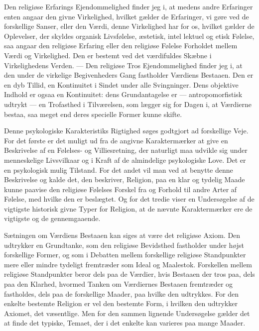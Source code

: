 \documentclass[12pt,a4paper]{article}
\newcommand{\opage}[1]{\marginnote{\footnotesize\textit{[#1]}}}
\begin{document}
Den religiøse Erfarings Ejendommelighed finder jeg i, at medens andre
Erfaringer enten angaar den givne Virkelighed, hvilket gælder de Erfaringer,
vi gøre ved de forskellige Sanser, eller den Værdi, denne Virkelighed har for
os, hvilket gælder de Oplevelser, der skyldes organisk Livsfølelse, æstetisk,
intel\-%
\opage{417}lektuel og etisk Følelse, saa angaar den religiøse Erfaring eller den religiøse
Følelse Forholdet mellem Værdi og Virkelighed. Den er bestemt ved det
værdifuldes Skæbne i Virkelighedens Verden. --- Den religiøse Tros
Ejendommelighed finder jeg i, at den under de virkelige Begivenheders Gang
fastholder Værdiens Bestaaen. Den er en dyb Tillid, en Kontinuitet i Sindet
under alle Svingninger. Dens objektive Indhold er ogsaa en Kontinuitet: dens
Grundantagelse er --- antropomorfistisk udtrykt --- en Trofasthed i
Tilværelsen, som lægger sig for Dagen i, at Værdierne bestaa, saa meget end
deres specielle Former kunne skifte.

Denne psykologiske Karakteristiks Rigtighed søges godtgjort ad forskellige
Veje. For det første er det muligt ud fra de angivne Karaktermærker at give en
Beskrivelse af en Følelses- og Villiesretning, der naturligt maa udvikle sig
under menneskelige Livsvilkaar og i Kraft af de almindelige psykologiske Love.
Det er en psykologisk mulig Tilstand. For det andet vil man ved at benytte
denne Beskrivelse og kalde det, den beskriver, Religion, paa en klar og tydelig
Maade kunne paavise den religiøse Følelses Forskel fra og Forhold til andre
Arter af Følelse, med hvilke den er beslægtet. Og for det tredie viser en
Undersøgelse af de vigtigste historisk givne Typer for Religion, at de nævnte
Karaktermærker ere de vigtigste og de gennemgaaende.

Sætningen om Værdiens Bestaaen kan siges at være det religiøse Axiom. Den
udtrykker en Grundtanke, som den religiøse Bevidsthed fastholder under højst
forskellige Former, og som i Debatten mellem forskellige religiøse Standpunkter
mere eller mindre tydeligt fremtræder som Ideal og Maalestok. Forskellen mellem
religiøse Standpunkter beror dels paa de Værdier, hvis Bestaaen der tros paa,
dels paa den Klarhed, hvormed Tanken om Værdiernes Bestaaen fremtræder og
fastholdes, dels paa de forskellige Maader, paa hvilke den udtrykkes. For den
enkelte bestemte Religion er vel den bestemte Form, i hvilken den udtrykker
Axiomet, det væsentlige. Men for den sammen%
\opage{418}lignende
Undersøgelse gælder det at finde det typiske, Temaet, der i det enkelte kan
varieres paa mange Maader.
\end{document}
